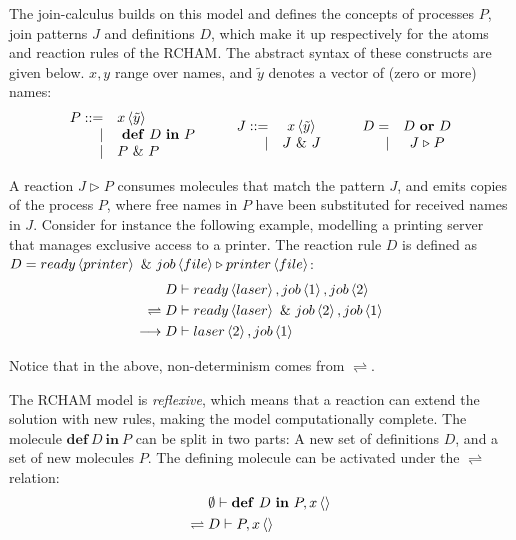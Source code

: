 The join-calculus builds on this model and defines the concepts of processes
$P$, join patterns $J$ and definitions $D$, which make it up respectively for
the atoms and reaction rules of the RCHAM. The abstract syntax of these
constructs are given below. $x,y$ range over names, and $\tilde y$ denotes a
vector of (zero or more) names:
\begin{displaymath}
\begin{array}{rl}
  P ::=& \atm x < \tilde y > \\
 |& \defJ D \inJ P\\
 |& P \andJ P
\end{array}\qquad
\begin{array}{rc}
  J ::=& \atm x < \tilde y > \\
 |& J \andJ J
\end{array}\qquad
\begin{array}{rc}
  D =& D \orJ D \\
 |& J \toJ{} P
\end{array}
\end{displaymath}

A reaction $J \triangleright P$ consumes molecules that match the pattern $J$,
and emits copies of the process $P$, where free names in $P$ have been
substituted for received names in $J$. Consider for instance the following
example, modelling a printing server that manages exclusive access to a printer.
The reaction rule $D$ is defined as $D = \atm ready<printer> ~\&~ \atm job<file>
\triangleright \atm printer<file>$:
\begin{align*}
  & D \vdash \atm ready<laser>, \atm job<1>, \atm job<2> \\
\rightleftharpoons{}& D \vdash \atm ready<laser> ~\&~ \atm job<2>, \atm job<1> \\
\longrightarrow{}& D \vdash \atm laser<2>, \atm job<1>
\end{align*}

Notice that in the above, non-determinism comes from $\rightleftharpoons$.

The RCHAM model is \emph{reflexive}, which means that a reaction can extend the
solution with new rules, making the model computationally complete. The molecule
$\mathbf{def}~D~\mathbf{in}~P$ can be split in two parts: A new set of
definitions $D$, and a set of new molecules $P$. The defining molecule can be
activated under the $\rightleftharpoons$ relation:
\begin{align*}
 & \emptyset \vdash \mathbf{def}~D~\mathbf{in}~P, \atm x<> \\
\rightleftharpoons{}& D \vdash P, \atm x<>
\end{align*}

